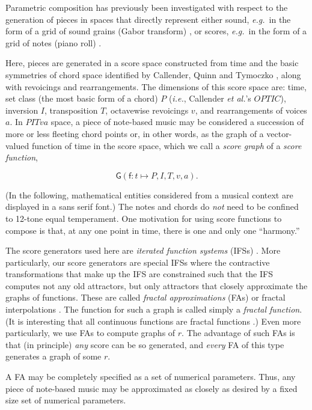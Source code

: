 \documentclass[english,11pt,letterpaper,onecolumn]{scrartcl}
\numberwithin{equation}{section}
\begin{document}
Parametric composition has previously been investigated with respect to the
generation of pieces in spaces that directly represent either sound,
\textit{e.g.}\ in the form of a grid of sound grains (Gabor transform)
\cite{obsessed}, or scores, \textit{e.g.}\ in the form of a grid of notes
(piano roll) \cite{ifsmusic}.

Here, pieces are generated in a score space constructed from time and the basic
symmetries of chord space identified by Callender, Quinn and Tymoczko
\cite{callender:346}, along with revoicings and rearrangements. The dimensions
of this score space are: time, set class (the most basic form of a  chord) $P$
(\textit{i.e.}, Callender \textit{et al.}'s $OPTIC$), inversion $I$,
transposition $T$, octavewise revoicings $v$, and rearrangements of voices $a$.
In $PITva$ space, a piece of note-based music may be considered a succession of
more or less fleeting chord points or, in other words, as the graph of a
vector-valued function of time in the score space, which we call a
\textit{score graph} of a \textit{score function},

$$\mathsf{G}(\mathsf{f}: t \mapsto P, I, T, v, a).$$

\noindent (In the following, mathematical entities considered from a musical context 
are displayed in a \textsf{sans serif} font.) The notes and chords do \textit{not} need to be confined to 12-tone
equal temperament. One motivation for using score functions to compose is that,
at any one point in time, there is one and only one ``harmony.''

The score generators used here are \textit{iterated function systems} (IFSs)
\cite{barnsley1985iterated, 10.2307/24893080, fractalseverywhere}. More
particularly, our score generators are special IFSs where the contractive
transformations that make up the IFS are constrained such that the IFS computes
not any old attractors, but only attractors that closely approximate the graphs
of functions. These are called \textit{fractal approximations} (FAs) or fractal
interpolations \cite{Barnsley1986, fractalseverywhere, navascues2014fractal}.
The function for such a graph is called simply a \textit{fractal function}. (It
is interesting that all continuous functions are fractal functions
\cite{2016arXiv161001369B}.) Even more particularly, we use FAs to compute
graphs of $r$. The advantage of such FAs is that (in principle) \textit{any}
score can be so generated, and \textit{every} FA of this type generates a graph
of some $r$.

A FA may be completely specified as a set of numerical parameters. Thus, any
piece of note-based music may be approximated as closely as desired by a fixed
size set of numerical parameters.
\end{document}
